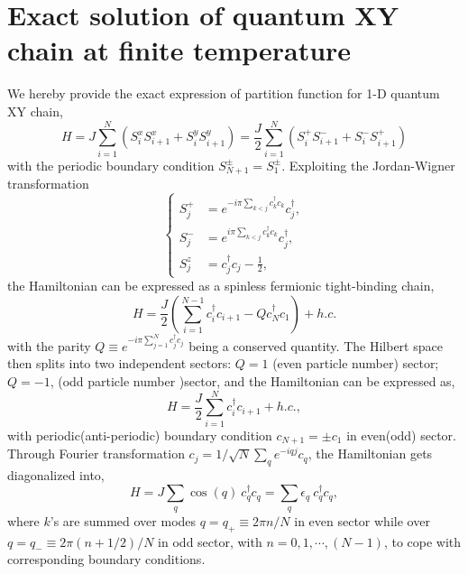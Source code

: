 \documentclass[aps,prx,twocolumn,showpacs,psfig,superscriptaddress,longbibliography]{revtex4-1}
\begin{document}
{
\section{Exact solution of quantum XY chain at finite temperature}
\label{App:Analytical}
We hereby provide the exact expression of partition function for 1-D quantum XY chain, 
\begin{equation}
H = J\sum_{i=1}^N \left(S^x_i S^x_{i+1} + S^y_i S^y_{i+1} \right) = \frac{J}{2}  \sum_{i=1}^N \left(S^+_i S^-_{i+1} + S^-_i S^+_{i+1}\right)
\end{equation}
with the periodic boundary condition $S^\pm_{N+1} = S^\pm_1$. 
Exploiting the Jordan-Wigner transformation
\begin{equation}
    \begin{cases}
S^+_j &= e^{-i\pi\sum_{k<j} c^\dagger_k c_k} c_j^\dagger, \\
S^-_j &= e^{i\pi\sum_{k<j} c^\dagger_k c_k} c_j^\dagger, \\
S^z_j &= c_j^\dagger c_j - \frac{1}{2},
    \end{cases}       
\end{equation}
the Hamiltonian can be expressed as a
spinless fermionic tight-binding chain,
\begin{equation}
H = \frac{J}{2}\left(\sum_{i=1}^{N-1} c^\dagger_i c_{i+1} - Q c^\dagger_N c_1\right) + h.c.
\end{equation}
with the parity $Q \equiv e^{-i\pi\sum_{j=1}^N c^\dagger_j c_j}$ being a conserved quantity. 
The Hilbert space then splits into two independent sectors: $Q=1$ (even particle number) sector; $Q=-1$, (odd particle number )sector, and the Hamiltonian can be expressed as, 
\begin{equation}
H = \frac{J}{2}\sum_{i=1}^{N} c^\dagger_i c_{i+1} + h.c.,
\end{equation}
with periodic(anti-periodic) boundary condition $c_{N+1} = \pm c_1$ in even(odd) sector. Through Fourier transformation $c_j = 1/\sqrt{N} \sum_q e^{-iqj} c_q$, the Hamiltonian gets diagonalized into, 
\begin{equation}
H = J\sum_q \cos{(q)} ~c_q^\dagger c_q = \sum_q \epsilon_q ~c_q^\dagger c_q,
\end{equation}
where $k$'s are summed over  modes $q=q_+\equiv 2\pi n/N$ in even sector while over $q=q_-\equiv 2\pi (n+1/2)/N$  in odd sector, with $n=0,1,\cdots,(N-1)$, to cope with corresponding boundary conditions. 

}
\end{document}
